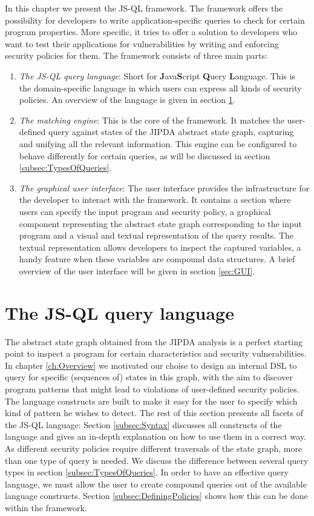 In this chapter we present the JS-QL framework. The framework offers the possibility for developers to write application-specific queries to check for certain program properties. More specific, it tries to offer a solution to developers who want to test their applications for vulnerabilities by writing and enforcing security policies for them. The framework consists of three main parts: 
\begin{enumerate}
\item \textit{The JS-QL query language}: Short for \textbf{J}ava\textbf{S}cript \textbf{Q}uery \textbf{L}anguage. This is the domain-specific language in which users can express all kinds of security policies. An overview of the language is given in section \ref{sec:JSQLlanguage}.
\item \textit{The matching engine}: This is the core of the framework. It matches the user-defined query against states of the JIPDA abstract state graph, capturing and unifying all the relevant information. This engine can be configured to behave differently for certain queries, as will be discussed in section \ref{subsec:TypesOfQueries}.
\item \textit{The graphical user interface}: The user interface provides the infrastructure for the developer to interact with the framework. It contains a section where users can specify the input program and security policy, a graphical component representing the abstract state graph corresponding to the input program and a visual and textual representation of the query results. The textual representation allows developers to inspect the captured variables, a handy feature when these variables are compound data structures. A brief overview of the user interface will be given in section \ref{sec:GUI}.
\end{enumerate}

\section{The JS-QL query language}
\label{sec:JSQLlanguage}

The abstract state graph obtained from the JIPDA analysis is a perfect starting point to inspect a program for certain characteristics and security vulnerabilities. In chapter \ref{ch:Overview} we motivated our choise to design an internal DSL to query for specific (sequences of) states in this graph, with the aim to discover program patterns that might lead to violations of user-defined security policies. The language constructs are built to make it easy for the user to specify which kind of pattern he wishes to detect. The rest of this section presents all facets of the JS-QL language: Section \ref{subsec:Syntax} discusses all constructs of the language and gives an in-depth explanation on how to use them in a correct way. As different security policies require different traversals of the state graph, more than one type of query is needed. We discuss the difference between several query types in section \ref{subsec:TypesOfQueries}. In order to have an effective query language, we must allow the user to create compound queries out of the available language constructs. Section \ref{subsec:DefiningPolicies} shows how this can be done within the framework.

